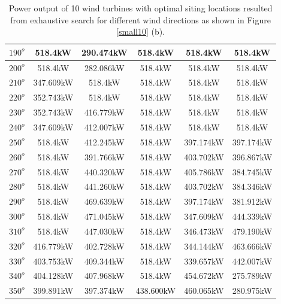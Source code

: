 \begin{table}[H]
\begin{tabular}{|c|c|c|c|c|c|}
        		$190^o$	& 518.4kW	& 290.474kW	& 518.4kW	& 518.4kW	& 518.4kW	\\ \hline
        		$200^o$	& 518.4kW	& 282.086kW	& 518.4kW	& 518.4kW	& 518.4kW	\\ \hline
        		$210^o$	& 347.609kW	& 518.4kW	& 518.4kW	& 518.4kW	& 518.4kW	\\ \hline
        		$220^o$	& 352.743kW	& 518.4kW	& 518.4kW	& 518.4kW	& 518.4kW	\\ \hline
        		$230^o$	& 352.743kW	& 416.779kW	& 518.4kW	& 518.4kW	& 518.4kW	\\ \hline
        		$240^o$	& 347.609kW	& 412.007kW	& 518.4kW	& 518.4kW	& 518.4kW	\\ \hline
        		$250^o$	& 518.4kW	& 412.245kW	& 518.4kW	& 397.174kW	& 397.174kW	\\ \hline
        		$260^o$	& 518.4kW	& 391.766kW	& 518.4kW	& 403.702kW	& 396.867kW	\\ \hline
        		$270^o$	& 518.4kW	& 440.320kW	& 518.4kW	& 405.786kW	& 384.745kW	\\ \hline
        		$280^o$	& 518.4kW	& 441.260kW	& 518.4kW	& 403.702kW	& 384.346kW	\\ \hline
        		$290^o$	& 518.4kW	& 469.639kW	& 518.4kW	& 397.174kW	& 381.912kW	\\ \hline
        		$300^o$	& 518.4kW	& 471.045kW	& 518.4kW	& 347.609kW	& 444.339kW	\\ \hline
        		$310^o$	& 518.4kW	& 447.030kW	& 518.4kW	& 346.473kW	& 479.190kW	\\ \hline
        		$320^o$	& 416.779kW	& 402.728kW	& 518.4kW	& 344.144kW	& 463.666kW	\\ \hline
        		$330^o$	& 403.753kW	& 409.344kW	& 518.4kW	& 339.657kW	& 442.007kW	\\ \hline
        		$340^o$	& 404.128kW	& 407.968kW	& 518.4kW	& 454.672kW	& 275.789kW	\\ \hline
        		$350^o$	& 399.891kW	& 397.374kW	& 438.600kW	& 460.065kW	& 280.975kW	\\ \hline
        	\end{tabular}
        	\caption{Power output of 10 wind turbines with optimal siting locations resulted from exhaustive search for different wind directions as shown in Figure \ref{small10} (b).}
        	\label{table10b}
        \end{table}
        \doublespacing
        

